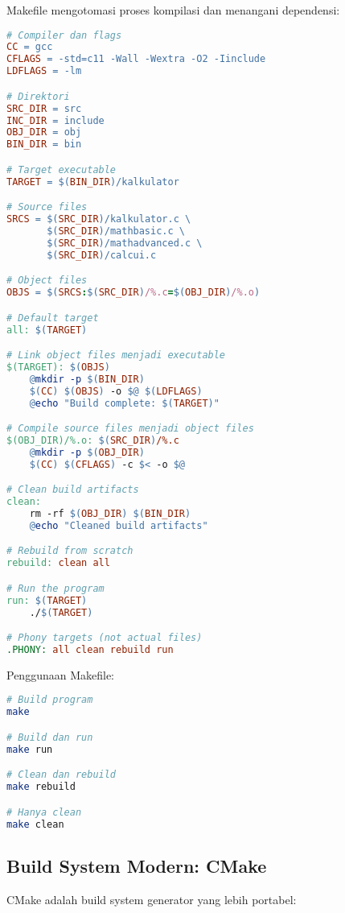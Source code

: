 \documentclass[../main.tex]{subfiles}
\begin{document}
Makefile mengotomasi proses kompilasi dan menangani dependensi:

\begin{lstlisting}[language=make, caption={Makefile lengkap untuk kalkulator}]
# Compiler dan flags
CC = gcc
CFLAGS = -std=c11 -Wall -Wextra -O2 -Iinclude
LDFLAGS = -lm

# Direktori
SRC_DIR = src
INC_DIR = include
OBJ_DIR = obj
BIN_DIR = bin

# Target executable
TARGET = $(BIN_DIR)/kalkulator

# Source files
SRCS = $(SRC_DIR)/kalkulator.c \
       $(SRC_DIR)/mathbasic.c \
       $(SRC_DIR)/mathadvanced.c \
       $(SRC_DIR)/calcui.c

# Object files
OBJS = $(SRCS:$(SRC_DIR)/%.c=$(OBJ_DIR)/%.o)

# Default target
all: $(TARGET)

# Link object files menjadi executable
$(TARGET): $(OBJS)
	@mkdir -p $(BIN_DIR)
	$(CC) $(OBJS) -o $@ $(LDFLAGS)
	@echo "Build complete: $(TARGET)"

# Compile source files menjadi object files
$(OBJ_DIR)/%.o: $(SRC_DIR)/%.c
	@mkdir -p $(OBJ_DIR)
	$(CC) $(CFLAGS) -c $< -o $@

# Clean build artifacts
clean:
	rm -rf $(OBJ_DIR) $(BIN_DIR)
	@echo "Cleaned build artifacts"

# Rebuild from scratch
rebuild: clean all

# Run the program
run: $(TARGET)
	./$(TARGET)

# Phony targets (not actual files)
.PHONY: all clean rebuild run
\end{lstlisting}

Penggunaan Makefile:
\begin{lstlisting}[language=bash, caption={Menggunakan Makefile}]
# Build program
make

# Build dan run
make run

# Clean dan rebuild
make rebuild

# Hanya clean
make clean
\end{lstlisting}

\subsection{Build System Modern: CMake}

CMake adalah build system generator yang lebih portabel:
\end{document}
